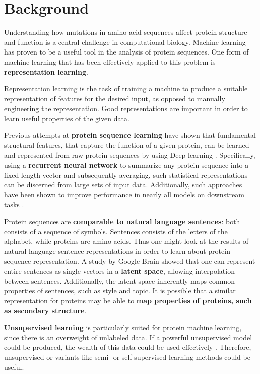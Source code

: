 \section*{Background}
Understanding how mutations in amino acid sequences affect protein structure and function is a central challenge in computational biology. Machine learning has proven to be a useful tool in the analysis of protein sequences. One form of machine learning that has been effectively applied to this problem is \textbf{representation learning}.

Representation learning is the task of training a machine to produce a suitable representation of features for the desired input, as opposed to manually engineering the representation. Good representations are important in order to learn useful properties of the given data.

Previous attempts at \textbf{protein sequence learning} have shown that fundamental structural features, that capture the function of a given protein, can be learned and represented from raw protein sequences by using Deep learning \cite{alley2019unified}. Specifically, using a \textbf{recurrent neural network} to summarize any protein sequence into a fixed length vector and subsequently averaging, such statistical representations can be discerned from large sets of input data. Additionally, such approaches have been shown to improve performance in nearly all models on downstream tasks \cite{rao2019evaluating}.

Protein sequences are \textbf{comparable to natural language sentences}: both consists of a sequence of symbols. Sentences consists of the letters of the alphabet, while proteins are amino acids. Thus one might look at the results of natural language sentence representations in order to learn about protein sequence representation. A study by Google Brain \cite{bowman2015generating} showed that one can represent entire sentences as single vectors in a \textbf{latent space}, allowing interpolation between sentences. Additionally, the latent space inherently maps common properties of sentences, such as style and topic. It is possible that a similar representation for proteins may be able to \textbf{map properties of proteins, such as secondary structure}.

\textbf{Unsupervised learning} is particularly suited for protein machine learning, since there is an overweight of unlabeled data. If a powerful unsupervised model could be produced, the wealth of this data could be used effectively \cite{AlQuraishiUnsupervised}. Therefore, unsupervised or variants like semi- or self-supervised learning methods could be useful.

